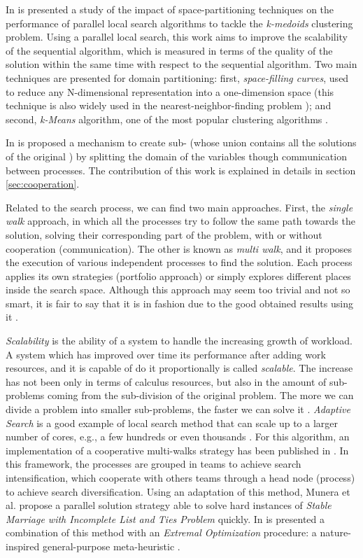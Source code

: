 In \cite{Arbelaez2012} is presented a study of the impact of space-partitioning techniques on the performance of parallel local search algorithms to tackle the \textit{k-medoids} clustering problem. Using a parallel local search, this work aims to improve the scalability of the sequential algorithm, which is measured in terms of the quality of the solution within the same time with respect to the sequential algorithm. Two main techniques are presented for domain partitioning: first, {\it space-filling curves}, used to reduce any N-dimensional representation into a one-dimension space (this technique is also widely used in the nearest-neighbor-finding problem \cite{Chen2005}); and second, {\it k-Means} algorithm, one of the most popular clustering algorithms \cite{Berkhin2002}.

In \cite{Arbab2000} is proposed a mechanism to create sub-\csps{} (whose union contains all the solutions of the original \csp) by splitting the domain of the variables though communication between processes. The contribution of this work is explained in details in section \ref{sec:cooperation}.

Related to the search process, we can find two main approaches. First, the {\it single walk} approach, in which all the processes try to follow the same path towards the solution, solving their corresponding part of the problem, with or without cooperation (communication). The other is known as {\it multi walk}, and it proposes the execution of various independent processes to find the solution. Each process applies its own strategies (portfolio approach) or simply explores different places inside the search space. Although this approach may seem too trivial and not so smart, it is fair to say that it is in fashion due to the good obtained results using it \cite{Diaz}.

\textit{Scalability} is the ability of a system to handle the increasing growth of workload. A system which has improved over time its performance after adding work resources, and it is capable of do it proportionally is called {\it scalable}. The increase has not been only in terms of calculus resources, but also in the amount of sub-problems coming from the sub-division of the original problem. The more we can divide a problem into smaller sub-problems, the faster we can solve it \cite{Hill}. \textit{Adaptive Search} is a good example of local search method that can scale up to a larger number of cores, e.g., a few hundreds or even thousands \cite{Diaz}. For this algorithm, an implementation of a cooperative multi-walks strategy has been published in \cite{Munera}. In this framework, the processes are grouped in teams to achieve search intensification, which cooperate with others teams through a head node (process) to achieve search diversification. Using an adaptation of this method, Munera et al. propose a parallel solution strategy able to solve hard instances of \textit{Stable Marriage with Incomplete List and Ties Problem} quickly. In \cite{Munera2016} is presented a combination of this method with an \textit{Extremal Optimization} procedure: a nature-inspired general-purpose meta-heuristic \cite{Boettcher2000}. 


